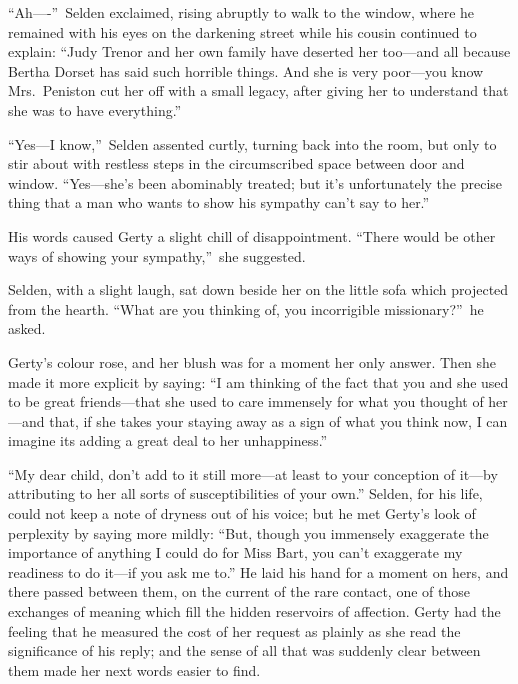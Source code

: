 \documentclass[12pt,a4paper]{book}
\begin{document}
``Ah----''\ Selden exclaimed, rising abruptly to walk to the window,
where he remained with his eyes on the darkening street while his
cousin continued to explain: ``Judy Trenor and her own family have
deserted her too---and all because Bertha Dorset has said such
horrible things. And she is very poor---you know Mrs.\ Peniston cut
her off with a small legacy, after giving her to understand that
she was to have everything.''





``Yes---I know,''\ Selden assented curtly, turning back into the
room, but only to stir about with restless steps in the
circumscribed space between door and window. ``Yes---she's been
abominably treated; but it's unfortunately the precise thing that
a man who wants to show his sympathy can't say to her.''





His words caused Gerty a slight chill of disappointment. ``There
would be other ways of showing your sympathy,''\ she suggested.





Selden, with a slight laugh, sat down beside her on the little
sofa which projected from the hearth. ``What are you thinking of,
you incorrigible missionary?''\ he asked.





Gerty's colour rose, and her blush was for a moment her only
answer. Then she made it more explicit by saying: ``I am
thinking of the fact that you and she used to be great
friends---that she used to care immensely for what you thought of
her---and that, if she takes your staying away as a sign of what
you think now, I can imagine its adding a great deal to her
unhappiness.''





``My dear child, don't add to it still more---at least to your
conception of it---by attributing to her all sorts of
susceptibilities of your own.'' Selden, for his life, could not
keep a note of dryness out of his voice; but he met Gerty's look
of perplexity by saying more mildly: ``But, though you immensely
exaggerate the importance of anything I could do for Miss Bart,
you can't exaggerate my readiness to do it---if you ask me to.'' He
laid his hand for a moment on hers, and there passed between
them, on the current of the rare contact, one of those exchanges
of meaning which fill the hidden reservoirs of affection. Gerty
had the feeling that he measured the cost of her request as
plainly as she read the significance of his reply; and the sense
of all that was suddenly clear between them made her next words
easier to find.
\end{document}

